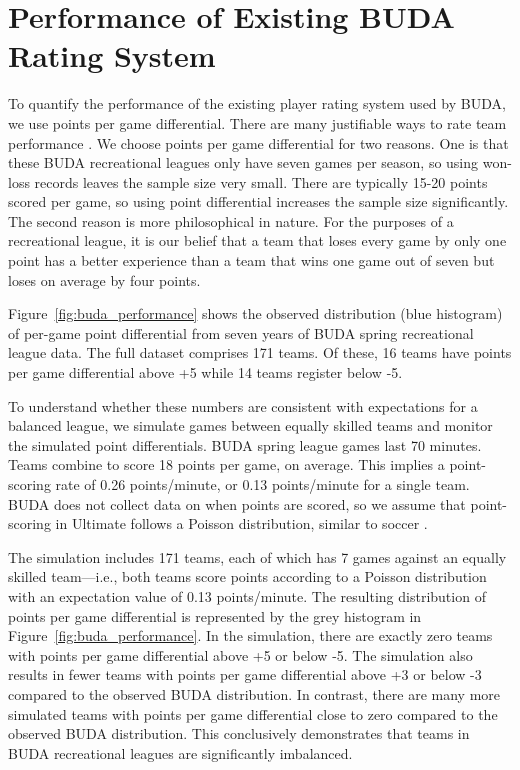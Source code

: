 \section{Performance of Existing BUDA Rating System}\label{sec:existing_performance}

To quantify the performance of the existing player rating system used by BUDA, we use points per game differential. There are many justifiable ways to rate team performance \cite{Langville_2012}.  We choose points per game differential for two reasons.  One is that these BUDA recreational leagues only have seven games per season, so using won-loss records leaves the sample size very small.  There are typically 15-20 points scored per game, so using point differential increases the sample size significantly.  The second reason is more philosophical in nature.  For the purposes of a recreational league, it is our belief that a team that loses every game by only one point has a better experience than a team that wins one game out of seven but loses on average by four points.  

Figure~\ref{fig:buda_performance} shows the observed distribution (blue histogram) of per-game point differential from seven years of BUDA spring recreational league data.  The full dataset comprises 171 teams.  Of these, 16 teams have points per game differential above +5 while 14 teams register below -5.  

To understand whether these numbers are consistent with expectations for a balanced league, we simulate games between equally skilled teams and monitor the simulated point differentials.  BUDA spring league games last 70 minutes.  Teams combine to score 18 points per game, on average. This implies a point-scoring rate of 0.26 points/minute, or 0.13 points/minute for a single team.  BUDA does not collect data on when points are scored, so we assume that point-scoring in Ultimate follows a Poisson distribution, similar to soccer \cite{Heuer_2010}.

The simulation includes 171 teams, each of which has 7 games against an equally skilled team---i.e., both teams score points according to a Poisson distribution with an expectation value of 0.13 points/minute. The resulting distribution of points per game differential is represented by the grey histogram in Figure~\ref{fig:buda_performance}.  In the simulation, there are exactly zero teams with points per game differential above +5 or below -5.  The simulation also results in fewer teams with points per game differential above +3 or below -3 compared to the observed BUDA distribution.  In contrast, there are many more simulated teams with points per game differential close to zero compared to the observed BUDA distribution.  This conclusively demonstrates that teams in BUDA recreational leagues are significantly imbalanced.

